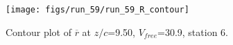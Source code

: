 \begin{figure}[H]
\centering
\texttt{[image: figs/run\_59/run\_59\_R\_contour]}
\caption{Contour plot of $\overline{r}$ at $z/c$=9.50, $V_{free}$=30.9, station 6.}
\end{figure}


